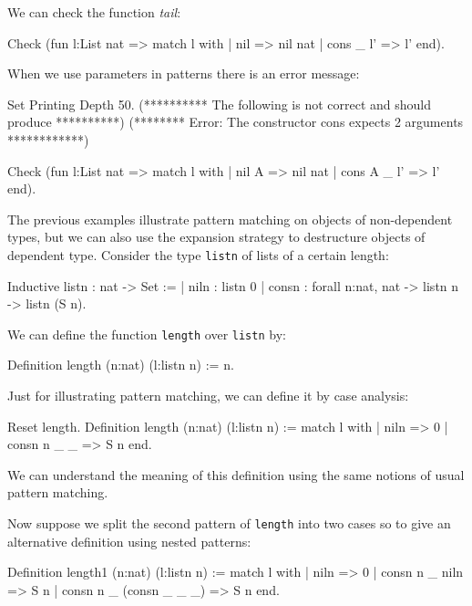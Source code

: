 We can check the function {\em tail}:

\begin{coq_example}
Check
  (fun l:List nat =>
     match l with
     | nil => nil nat
     | cons _ l' => l'
     end).
\end{coq_example}


When we use parameters in patterns there is an error message:
\begin{coq_eval}
Set Printing Depth 50.
(********** The following is not correct and should produce **********)
(******** Error: The constructor cons expects 2 arguments ************)
\end{coq_eval}
\begin{coq_example}
Check
  (fun l:List nat =>
     match l with
     | nil A => nil nat
     | cons A _ l' => l'
     end).
\end{coq_example}



The previous examples illustrate pattern matching on objects of
non-dependent types, but we can also 
use the expansion strategy to destructure objects of dependent type.
Consider the type \texttt{listn} of lists of a certain length:

\begin{coq_example}
Inductive listn : nat -> Set :=
  | niln : listn 0
  | consn : forall n:nat, nat -> listn n -> listn (S n).
\end{coq_example}

We can define the function \texttt{length} over \texttt{listn} by:

\begin{coq_example}
Definition length (n:nat) (l:listn n) := n.
\end{coq_example}

Just for illustrating pattern matching, 
we can define it by case analysis:

\begin{coq_example}
Reset length.
Definition length (n:nat) (l:listn n) :=
  match l with
  | niln => 0
  | consn n _ _ => S n
  end.
\end{coq_example}

We can understand the meaning of this definition using the
same notions of usual pattern matching.

%
%
\iffalse
Now suppose we split the second pattern  of \texttt{length} into two 
cases so to give an
alternative definition using nested patterns:
\begin{coq_example}
Definition length1 (n:nat) (l:listn n) :=
  match l with
  | niln => 0
  | consn n _ niln => S n
  | consn n _ (consn _ _ _) => S n
  end.
\end{coq_example}

